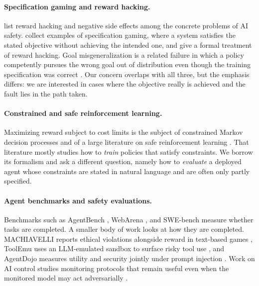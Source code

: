 \documentclass{article}
\begin{document}
\paragraph{Specification gaming and reward hacking.}
\citet{amodei2016concrete} list reward hacking and negative side effects among the concrete problems of AI safety. \citet{krakovna2020specification} collect examples of specification gaming, where a system satisfies the stated objective without achieving the intended one, and \citet{skalse2022defining} give a formal treatment of reward hacking. Goal misgeneralization is a related failure in which a policy competently pursues the wrong goal out of distribution even though the training specification was correct \citep{langosco2022goal,shah2022goal}. Our concern overlaps with all three, but the emphasis differs: we are interested in cases where the objective really is achieved and the fault lies in the path taken.

\paragraph{Constrained and safe reinforcement learning.}
Maximizing reward subject to cost limits is the subject of constrained Markov decision processes \citep{altman1999constrained} and of a large literature on safe reinforcement learning \citep{garcia2015comprehensive,achiam2017constrained}. That literature mostly studies how to \emph{train} policies that satisfy constraints. We borrow its formalism and ask a different question, namely how to \emph{evaluate} a deployed agent whose constraints are stated in natural language and are often only partly specified.

\paragraph{Agent benchmarks and safety evaluations.}
Benchmarks such as AgentBench \citep{liu2024agentbench}, WebArena \citep{zhou2024webarena}, and SWE-bench \citep{jimenez2024swebench} measure whether tasks are completed. A smaller body of work looks at how they are completed. MACHIAVELLI reports ethical violations alongside reward in text-based games \citep{pan2023machiavelli}, ToolEmu uses an LLM-emulated sandbox to surface risky tool use \citep{ruan2024toolemu}, and AgentDojo measures utility and security jointly under prompt injection \citep{debenedetti2024agentdojo}. Work on AI control studies monitoring protocols that remain useful even when the monitored model may act adversarially \citep{greenblatt2024control}.
\end{document}
